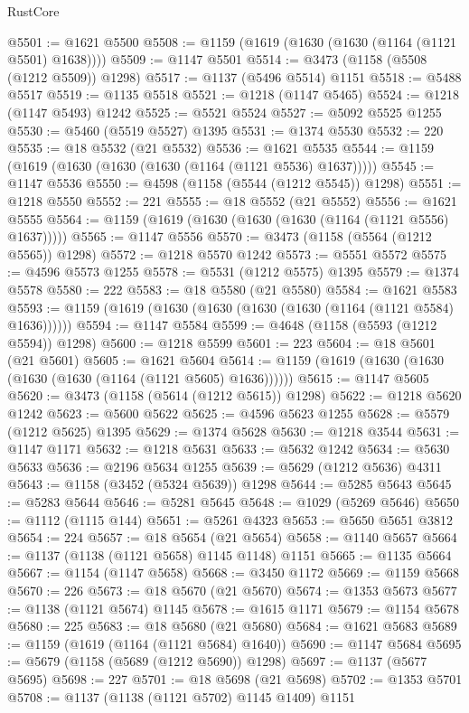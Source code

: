 \begin{lexlean}{RustCore}
\begin{coremodule}
@5501 := @1621 @5500
@5508 := @1159 (@1619 (@1630 (@1630 (@1164 (@1121 @5501) @1638))))
@5509 := @1147 @5501
@5514 := @3473 (@1158 (@5508 (@1212 @5509)) @1298)
@5517 := @1137 (@5496 @5514) @1151
@5518 := @5488 @5517
@5519 := @1135 @5518
@5521 := @1218 (@1147 @5465)
@5524 := @1218 (@1147 @5493) @1242
@5525 := @5521 @5524
@5527 := @5092 @5525 @1255
@5530 := @5460 (@5519 @5527) @1395
@5531 := @1374 @5530
@5532 := 220
@5535 := @18 @5532 (@21 @5532)
@5536 := @1621 @5535
@5544 := @1159 (@1619 (@1630 (@1630 (@1630 (@1164 (@1121 @5536) @1637)))))
@5545 := @1147 @5536
@5550 := @4598 (@1158 (@5544 (@1212 @5545)) @1298)
@5551 := @1218 @5550
@5552 := 221
@5555 := @18 @5552 (@21 @5552)
@5556 := @1621 @5555
@5564 := @1159 (@1619 (@1630 (@1630 (@1630 (@1164 (@1121 @5556) @1637)))))
@5565 := @1147 @5556
@5570 := @3473 (@1158 (@5564 (@1212 @5565)) @1298)
@5572 := @1218 @5570 @1242
@5573 := @5551 @5572
@5575 := @4596 @5573 @1255
@5578 := @5531 (@1212 @5575) @1395
@5579 := @1374 @5578
@5580 := 222
@5583 := @18 @5580 (@21 @5580)
@5584 := @1621 @5583
@5593 := @1159 (@1619 (@1630 (@1630 (@1630 (@1630 (@1164 (@1121 @5584) @1636))))))
@5594 := @1147 @5584
@5599 := @4648 (@1158 (@5593 (@1212 @5594)) @1298)
@5600 := @1218 @5599
@5601 := 223
@5604 := @18 @5601 (@21 @5601)
@5605 := @1621 @5604
@5614 := @1159 (@1619 (@1630 (@1630 (@1630 (@1630 (@1164 (@1121 @5605) @1636))))))
@5615 := @1147 @5605
@5620 := @3473 (@1158 (@5614 (@1212 @5615)) @1298)
@5622 := @1218 @5620 @1242
@5623 := @5600 @5622
@5625 := @4596 @5623 @1255
@5628 := @5579 (@1212 @5625) @1395
@5629 := @1374 @5628
@5630 := @1218 @3544
@5631 := @1147 @1171
@5632 := @1218 @5631
@5633 := @5632 @1242
@5634 := @5630 @5633
@5636 := @2196 @5634 @1255
@5639 := @5629 (@1212 @5636) @4311
@5643 := @1158 (@3452 (@5324 @5639)) @1298
@5644 := @5285 @5643
@5645 := @5283 @5644
@5646 := @5281 @5645
@5648 := @1029 (@5269 @5646)
@5650 := @1112 (@1115 @144)
@5651 := @5261 @4323
@5653 := @5650 @5651 @3812
@5654 := 224
@5657 := @18 @5654 (@21 @5654)
@5658 := @1140 @5657
@5664 := @1137 (@1138 (@1121 @5658) @1145 @1148) @1151
@5665 := @1135 @5664
@5667 := @1154 (@1147 @5658)
@5668 := @3450 @1172
@5669 := @1159 @5668
@5670 := 226
@5673 := @18 @5670 (@21 @5670)
@5674 := @1353 @5673
@5677 := @1138 (@1121 @5674) @1145
@5678 := @1615 @1171
@5679 := @1154 @5678
@5680 := 225
@5683 := @18 @5680 (@21 @5680)
@5684 := @1621 @5683
@5689 := @1159 (@1619 (@1164 (@1121 @5684) @1640))
@5690 := @1147 @5684
@5695 := @5679 (@1158 (@5689 (@1212 @5690)) @1298)
@5697 := @1137 (@5677 @5695)
@5698 := 227
@5701 := @18 @5698 (@21 @5698)
@5702 := @1353 @5701
@5708 := @1137 (@1138 (@1121 @5702) @1145 @1409) @1151

\end{coremodule}
\end{lexlean}
